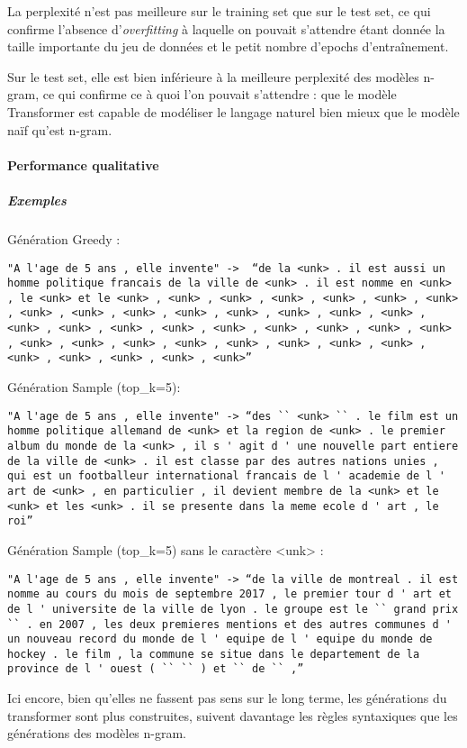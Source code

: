 La perplexité n'est pas meilleure sur le training set que sur
le test set, ce qui confirme l'absence d'\emph{overfitting} à laquelle
on pouvait s'attendre étant donnée la taille importante du jeu de
données et le petit nombre d'epochs d'entraînement.

Sur le test set, elle est bien inférieure à la
meilleure perplexité des modèles n-gram, ce qui confirme ce
à quoi l'on pouvait s'attendre : que le modèle Transformer est capable
de modéliser le langage naturel bien mieux que le modèle naïf qu'est
n-gram.

\hypertarget{performance-qualitative-1}{%
\paragraph{Performance qualitative}\label{performance-qualitative-1}}

\hypertarget{exemples}{%
\subparagraph{Exemples}\label{exemples}}

Génération Greedy :

\begin{verbatim}
"A l'age de 5 ans , elle invente" ->  “de la <unk> . il est aussi un homme politique francais de la ville de <unk> . il est nomme en <unk> , le <unk> et le <unk> , <unk> , <unk> , <unk> , <unk> , <unk> , <unk> , <unk> , <unk> , <unk> , <unk> , <unk> , <unk> , <unk> , <unk> , <unk> , <unk> , <unk> , <unk> , <unk> , <unk> , <unk> , <unk> , <unk> , <unk> , <unk> , <unk> , <unk> , <unk> , <unk> , <unk> , <unk> , <unk> , <unk> , <unk> , <unk> , <unk>”
\end{verbatim}

Génération Sample (top_k=5):

\begin{verbatim}
"A l'age de 5 ans , elle invente" -> “des `` <unk> `` . le film est un homme politique allemand de <unk> et la region de <unk> . le premier album du monde de la <unk> , il s ' agit d ' une nouvelle part entiere de la ville de <unk> . il est classe par des autres nations unies , qui est un footballeur international francais de l ' academie de l ' art de <unk> , en particulier , il devient membre de la <unk> et le <unk> et les <unk> . il se presente dans la meme ecole d ' art , le roi”
\end{verbatim}

Génération Sample (top_k=5) sans le caractère <unk> :

\begin{verbatim}
"A l'age de 5 ans , elle invente" -> “de la ville de montreal . il est nomme au cours du mois de septembre 2017 , le premier tour d ' art et de l ' universite de la ville de lyon . le groupe est le `` grand prix `` . en 2007 , les deux premieres mentions et des autres communes d ' un nouveau record du monde de l ' equipe de l ' equipe du monde de hockey . le film , la commune se situe dans le departement de la province de l ' ouest ( `` `` ) et `` de `` ,”
\end{verbatim}

Ici encore, bien qu'elles ne fassent pas sens sur le long terme, les générations du transformer sont plus construites, suivent davantage les règles syntaxiques que les générations des modèles n-gram.
